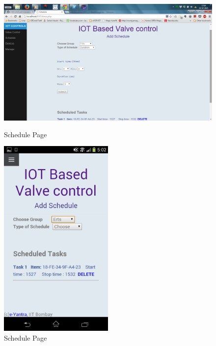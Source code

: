 \documentclass[16pt]{article}
\begin{document}
	\begin{figure}
		\includegraphics[width=1.2\textwidth]{images/schedule.png}
		\caption{Schedule Page}
		\includegraphics[width=0.5\textwidth]{images/schedule_page.png}
		\caption{Schedule Page}
	\end{figure}
\end{document}
